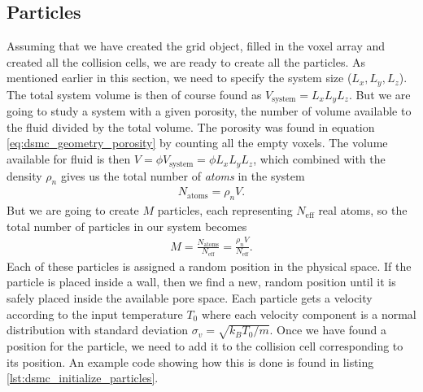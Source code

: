 \subsection{Particles}
Assuming that we have created the grid object, filled in the voxel array and created all the collision cells, we are ready to create all the particles. As mentioned earlier in this section, we need to specify the system size ($L_x, L_y, L_z$). The total system volume is then of course found as $V_\text{system} = L_xL_yL_z$. But we are going to study a system with a given porosity, the number of volume available to the fluid divided by the total volume. The porosity was found in equation \eqref{eq:dsmc_geometry_porosity} by counting all the empty voxels. The volume available for fluid is then $V = \phi V_\text{system} = \phi L_xL_yL_z$, which combined with the density $\rho_n$ gives us the total number of \textit{atoms} in the system 
\begin{align}
	N_\text{atoms} = \rho_n V.
\end{align}
But we are going to create $M$ particles, each representing $N_\text{eff}$ real atoms, so the total number of particles in our system becomes
\begin{align}
	M = \frac{N_\text{atoms}}{N_\text{eff}} = \frac{\rho_n V}{N_\text{eff}}.
\end{align}
Each of these particles is assigned a random position in the physical space. If the particle is placed inside a wall, then we find a new, random position until it is safely placed inside the available pore space. Each particle gets a velocity according to the input temperature $T_0$ where each velocity component is a normal distribution with standard deviation $\sigma_v = \sqrt{k_BT_0/m}$. Once we have found a position for the particle, we need to add it to the collision cell corresponding to its position. An example code showing how this is done is found in listing \ref{lst:dsmc_initialize_particles}.
